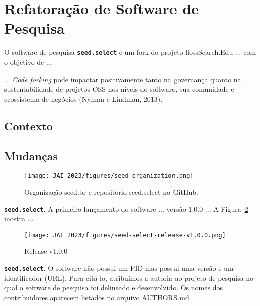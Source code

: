 \section{Refatoração de Software de Pesquisa}
\label{section:casesstudy:seed}

O software de pesquisa \textbf{\texttt{seed.select}} é um fork do projeto
flossSearch.Edu
... com o objetivo de ...


...
\textit{Code forking} pode impactar positivamente tanto na governança quanto na sustentabilidade de projetos OSS nos níveis do software, sua comunidade e ecossistema de negócios (Nyman e Lindman, 2013).


\subsection{Contexto}

\subsection{Mudanças}

\begin{figure}[htb]
    \centering
    \texttt{[image: JAI 2023/figures/seed-organization.png]}
    \caption{Organização seed.br e repositório seed.select no GitHub.}
    \label{fig:hospedagem:seed}
\end{figure}

\noindent \textbf{\texttt{seed.select}}.
A primeiro lançamento do software ... versão 1.0.0 ...
A Figura~\ref{fig:seed-select-release} mostra ...

\begin{figure}[htb]
    \centering
    \texttt{[image: JAI 2023/figures/seed-select-release-v1.0.0.png]}
    \caption{Release v1.0.0}
    \label{fig:seed-select-release}
\end{figure}

\noindent \textbf{\texttt{seed.select}}.
O software não possui um PID mas possui uma versão e um identificador (URL).
Para citá-lo, atribuímos a autoria ao projeto de pesquisa no qual o software de pesquisa foi delineado e desenvolvido. 
Os nomes dos contribuidores aparecem listados no arquivo AUTHORS.md.

